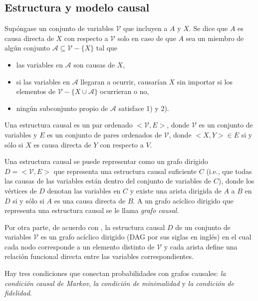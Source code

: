 \subsection{Estructura y modelo causal}

Supóngase un conjunto de variables $\mathcal{V}$ que incluyen a $A$ y $X$. 
Se dice que $A$ es causa directa de $X$ con respecto a $\mathcal{V}$
solo en caso de que $A$ sea un miembro de algún conjunto 
$\mathcal{A} \subseteq \mathcal{V} - \{X\}$ tal que 

\begin{itemize}
    \item las variables en $\mathcal{A}$ son causas de $X$,
    \item si las variables en $\mathcal{A}$ llegaran a ocurrir,
    causarían $X$ sin importar si los elementos de $\mathcal{V} - \{X \cup \mathcal{A}\}$ ocurrieran o no,
    \item ningún subconjunto propio de $\mathcal{A}$ satisface
    1) y 2).
\end{itemize}

Una estructura causal es un par ordenado $<\mathcal{V}, E>$, donde
$\mathcal{V}$ es un conjunto de variables y $E$ es un conjunto
de pares ordenados de $\mathcal{V}$, donde $<X, Y> \in E$ si
y sólo si $X$ es causa directa de $Y$ con respecto a  
$V$\cite{spirtes2000causation}.

Una estructura causal se puede representar como un grafo
dirigido $D = <\mathcal{V},E>$ que representa una estructura causal suficiente $C$ (i.e., que todas las causas de las variables están dentro del conjunto de variables de $C$), donde los vértices de $D$ denotan las variables en $C$ y existe una
arista dirigida de $A$ a $B$ en $D$ si y sólo si $A$ es
una causa directa de $B$.
A un grafo acíclico dirigido que representa una estructura causal se le llama \textit{grafo causal}.

Por otra parte, de acuerdo con \cite{pearl_2009}, la estructura causal $D$ de un conjunto de variables $\mathcal{V}$ es un grafo acíclico dirigido (DAG por sus siglas en inglés) en el cual cada nodo corresponde a un elemento distinto de $\mathcal{V}$ y cada arista define una relación funcional directa entre las
variables correspondientes. 


Hay tres condiciones que conectan probabilidades con
grafos causales: \textit{la condición causal de Markov}, \textit{la condición de minimalidad} y \textit{la condición
de fidelidad}.

